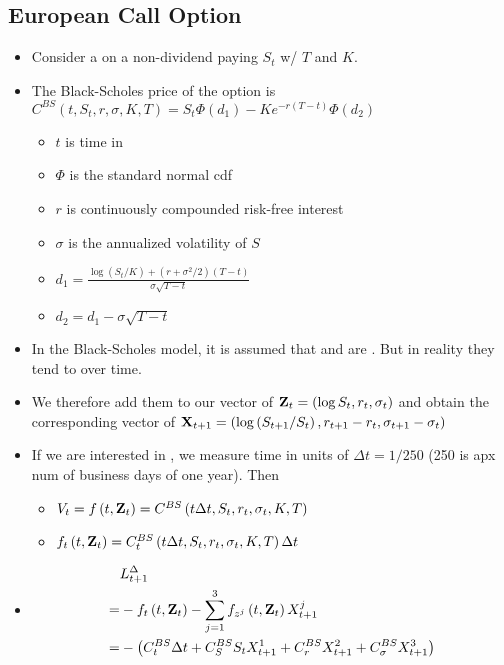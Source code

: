 \subsection*{European Call Option}
\begin{itemize}[leftmargin=*]
    \item Consider a  on a non-dividend paying  $S_{t}$ w/  $T$ and  $K$.
    \item The Black-Scholes price of the option is
$
C^{B S}\left(t, S_{t}, r, \sigma, K, T\right)=S_{t} \Phi\left(d_{1}\right)-K e^{-r(T-t)} \Phi\left(d_{2}\right)
$
    \begin{itemize}[leftmargin=*]
        \item $t$ is time in 
        \item $\Phi$ is the standard normal cdf
        \item $r$ is continuously compounded risk-free interest
        \item $\sigma$ is the annualized volatility of $S$
        \item $d_{1}=\frac{\log \left(S_{t} / K\right)+\left(r+\sigma^{2} / 2\right)(T-t)}{\sigma \sqrt{T-t}}$
        \item $d_{2}=d_{1}-\sigma \sqrt{T-t}$
    \end{itemize}
    \item In the Black-Scholes model, it is assumed that  and  are . But in reality they tend to  over time.
    \item We therefore add them to our vector of 
$
\boldsymbol{\mathbf{Z}}_{t}=\left(\log S_{t}, r_{t}, \sigma_{t}\right)
$
and obtain the corresponding vector of 
$
\boldsymbol{\mathbf{X}}_{t+1}=\left(\log \left(S_{t+1} / S_{t}\right), r_{t+1}-r_{t}, \sigma_{t+1}-\sigma_{t}\right)
$
    \item If we are interested in , we measure time in units of $\Delta t=1 / 250$ (250 is apx num of business days of one year). Then
    \begin{itemize}[leftmargin=*]
        \item $V_{t}=f\left(t, \boldsymbol{\mathbf{Z}}_{t}\right)=C^{B S}\left(t \Delta t, S_{t}, r_{t}, \sigma_{t}, K, T\right)$
        \item $f_{t}\left(t, \boldsymbol{\mathbf{Z}}_{t}\right)=C_{t}^{B S}\left(t \Delta t, S_{t}, r_{t}, \sigma_{t}, K, T\right) \Delta t$
    \end{itemize}
    \item {}
$$
\begin{aligned}
&L_{t+1}^{\Delta}\\
=&-f_{t}\left(t, \boldsymbol{\mathbf{Z}}_{t}\right)-\sum_{j=1}^{3} f_{z^{j}}\left(t, \boldsymbol{\mathbf{Z}}_{t}\right) X_{t+1}^{j} \\
=&-\left(C_{t}^{B S} \Delta t+C_{S}^{B S} S_{t} X_{t+1}^{1}+C_{r}^{B S} X_{t+1}^{2}+C_{\sigma}^{B S} X_{t+1}^{3}\right)
\end{aligned}
$$


\end{itemize}
